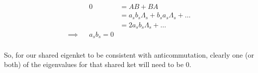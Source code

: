 \begin{answer}
  \begin{equation}
    \begin{alignedat}{2}
      &&0
      &= AB + BA\\
      &&&= a_sb_s\Lambda_s + b_sa_s\Lambda_s + \ldots\\
      &&&= 2a_sb_s\Lambda_s + \ldots\\
      \implies && a_sb_s = 0\\
    \end{alignedat}
  \end{equation}

  So, for our shared eigenket to be consistent with anticommutation,
  clearly one (or both) of the eigenvalues for that shared ket will
  need to be $0$.

\end{answer}
